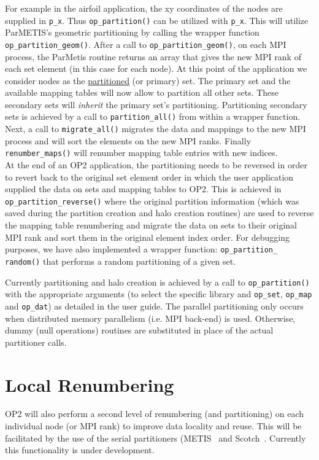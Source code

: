 \documentclass[11pt]{article}
\begin{document}
\indent For example in the airfoil application, the xy coordinates of the nodes are supplied in \texttt{p\_x}. Thus
\texttt{op\_partition()} can be utilized with \texttt{p\_x}. This will utilize ParMETIS's geometric partitioning by
calling the wrapper function \texttt{op\_partition\_geom()}. After a call to \texttt{op\_partition\_geom()}, on
each MPI process, the ParMetis routine returns an array that gives the new MPI rank of each set element (in this case
for each node). At this point of the application we consider nodes as the \underline{partitioned} (or primary) set. The
primary set and the available mapping tables will now allow to partition all other sets. These secondary sets will
\textit{inherit} the primary set's partitioning. Partitioning secondary sets is achieved by a call to
\texttt{partition\_all()} from within a wrapper function. Next, a call to \texttt{migrate\_all()} migrates the data and
mappings to the new MPI process and will sort the elements on the new MPI ranks.  Finally \texttt{renumber\_maps()}
will renumber mapping table entries with new indices. \\
\indent At the end of an OP2 application, the partitioning needs to be reversed in order to revert back to the original
set element order in which the user application supplied the data on sets and mapping tables to OP2. This is achieved in
\texttt{op\_partition\_reverse()} where the original partition information (which was saved during the partition
creation and halo creation routines) are used to reverse the mapping table renumbering and migrate the data on sets to
their original MPI rank and sort them in the original element index order. For debugging purposes, we have also
implemented a wrapper function: \texttt{op\_partition\_ random()} that performs a random partitioning of a given set.

Currently partitioning and halo creation is achieved by a call to \texttt{op\_partition()} with the appropriate
arguments (to select the specific library and \texttt{op\_set}, \texttt{op\_map} and \texttt{op\_dat}) as detailed in
the user guide. The parallel partitioning only occurs when distributed memory parallelism (i.e. MPI back-end) is used.
Otherwise, dummy (null operations) routines are substituted in place of the actual partitioner calls.

\section{Local Renumbering}\label{sec/localrenumbering}
OP2 will also perform a second level of renumbering (and partitioning) on each individual node (or MPI rank) to improve
data locality and reuse. This will be facilitated by the use of the serial partitioners (METIS~\cite{metis} and
Scotch~\cite{PTScotch}. Currently this functionality is under development.
\end{document}
